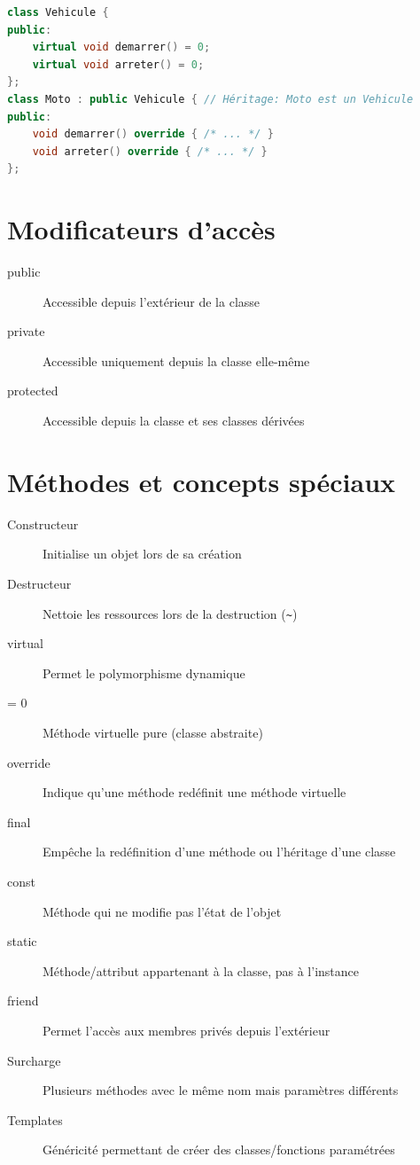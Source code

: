 \documentclass{article}
\begin{document}
\begin{multicols*}{3}
\begin{lstlisting}[language=C++]
class Vehicule {
public:
    virtual void demarrer() = 0;
    virtual void arreter() = 0;
};
class Moto : public Vehicule { // Héritage: Moto est un Vehicule
public:
    void demarrer() override { /* ... */ }
    void arreter() override { /* ... */ }
};
\end{lstlisting}
\section*{Modificateurs d'accès}
\begin{description}
\item[public] Accessible depuis l'extérieur de la classe \\
\item[private] Accessible uniquement depuis la classe elle-même \\
\item[protected] Accessible depuis la classe et ses classes dérivées
\end{description}

\section*{Méthodes et concepts spéciaux}
\begin{description}
\item[Constructeur] Initialise un objet lors de sa création
\item[Destructeur] Nettoie les ressources lors de la destruction (\texttt{\textasciitilde{}})
\item[virtual] Permet le polymorphisme dynamique
\item[= 0] Méthode virtuelle pure (classe abstraite)
\item[override] Indique qu'une méthode redéfinit une méthode virtuelle
\item[final] Empêche la redéfinition d'une méthode ou l'héritage d'une classe
\item[const] Méthode qui ne modifie pas l'état de l'objet
\item[static] Méthode/attribut appartenant à la classe, pas à l'instance
\item[friend] Permet l'accès aux membres privés depuis l'extérieur
\item[Surcharge] Plusieurs méthodes avec le même nom mais paramètres différents
\item[Templates] Généricité permettant de créer des classes/fonctions paramétrées
\end{description}


\end{multicols*}
\end{document}
